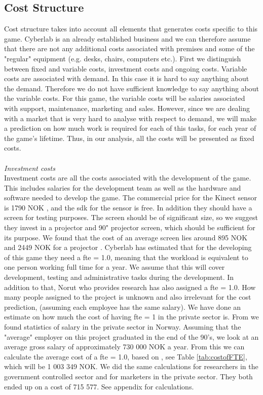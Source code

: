 \subsection{Cost Structure}
Cost structure takes into account all elements that generates costs specific to this game. Cyberlab is an already established business and we can therefore assume that there are not any additional costs associated with premises and some of the "regular" equipment (e.g. desks, chairs, computers etc.). First we distinguish between fixed and variable costs, investment costs and ongoing costs. Variable costs are associated with demand. In this case it is hard to say anything about the demand. Therefore we do not have sufficient knowledge to say anything about the variable costs. For this game, the variable costs will be salaries associated with support, maintenance, marketing and sales. However, since we are dealing with a market that is very hard to analyse with respect to demand, we will make a prediction on how much work is required for each of this tasks, for each year of the game's lifetime. Thus, in our analysis, all the costs will be presented as fixed costs.  \\ \\
\emph{Investment costs}\\
Investment costs are all the costs associated with the development of the game. This includes salaries for the development team as well as the hardware and software needed to develop the game. The commercial price for the Kinect sensor is 1790 NOK \cite{pricekinect}, and the \ac{sdk} for the sensor is free. In addition they should have a screen for testing purposes. The screen should be of significant size, so we suggest they invest in a projector and 90" projector screen, which should be sufficient for its purpose. We found that the cost of an average screen lies around 895 NOK and 2449 NOK for a projector \cite{priceprojector}\cite{pricescreen}. Cyberlab has estimated that for the developing of this game they need a \ac{fte} = 1.0, meaning that the workload is equivalent to one person working full time for a year. We assume that this will cover development, testing and administrative tasks during the development. In addition to that, Norut who provides research has also assigned a \ac{fte} = 1.0. How many people assigned to the project is unknown and also irrelevant for the cost prediction, (assuming each employee has the same salary). We have done an estimate on how much the cost of having \ac{fte} = 1 in the private sector is. From \cite{tekna} we found statistics of salary in the private sector in Norway. Assuming that the "average" employer on this project graduated in the end of the 90's, we look at an average gross salary of approximately 730 000 NOK a year. From this we can calculate the average cost of a \ac{fte} = 1.0, based on \cite{altinn}, see Table \ref{tab:costofFTE}, which will be 1 003 349 NOK. We did the same calculations for researchers in the government controlled sector and for marketers in the private sector. They both ended up on a cost of 715 577. See appendix for calculations. \\ \\

